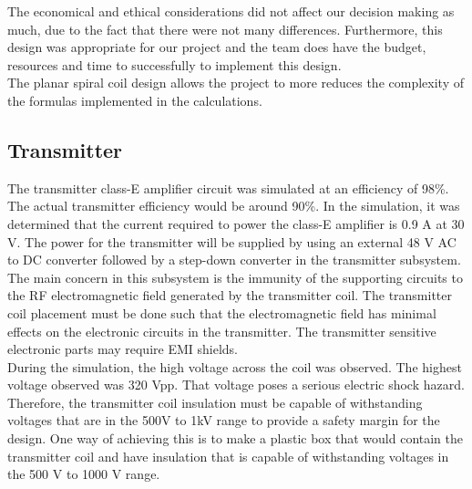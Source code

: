 \documentclass[12pt]{article}
\begin{document}
\indent
The economical and ethical considerations did not affect our decision making as much, due to the fact that there were not many differences. Furthermore, this design was appropriate for our project and the team does have the budget, resources and time to successfully to implement this design. \\

\indent
The planar spiral coil design allows the project to more reduces the complexity of the formulas implemented in the calculations. 


\subsection{Transmitter}

\indent \indent
The transmitter class-E amplifier circuit was simulated at an efficiency of 98\%. The actual transmitter efficiency would be around 90\%. In the simulation, it was determined that the current required to power the class-E amplifier is 0.9 A at 30 V. The power for the transmitter will be supplied by using an external 48 V AC to DC converter followed by a step-down converter in the transmitter subsystem.\\

\indent
The main concern in this subsystem is the immunity of the supporting circuits to the RF electromagnetic field generated by the transmitter coil. The transmitter coil placement must be done such that the electromagnetic field has minimal effects on the electronic circuits in the transmitter. The transmitter sensitive electronic parts may require EMI shields.\\

\indent
During the simulation, the high voltage across the coil was observed. The highest voltage observed was 320 Vpp. That voltage poses a serious electric shock hazard. Therefore, the transmitter coil insulation must be capable of withstanding voltages that are in the 500V to 1kV range to provide a safety margin for the design. One way of achieving this is to make a plastic box that would contain the transmitter coil and have insulation that is capable of withstanding voltages in the 500 V to 1000 V range.  \\
\end{document}
